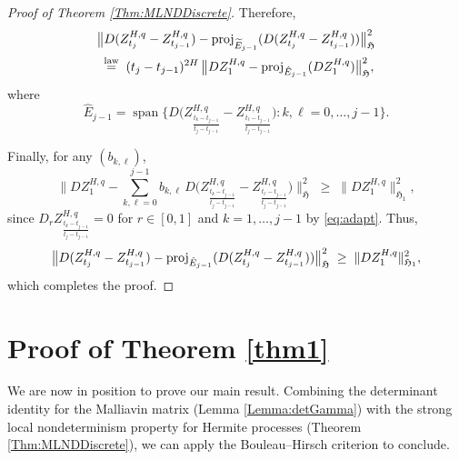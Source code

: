 \documentclass[a4paper,10pt]{article}
\theoremstyle{definition}
\theoremstyle{plain}
\newcommand\HHH{\mathfrak{H}}
\newcommand\1{\mathbbm{1}}
\begin{document}
\begin{proof}[Proof of Theorem \ref{Thm:MLNDDiscrete}]
Therefore,
\begin{align*}
&\big\| D(Z^{H,q}_{t_j}-Z^{H,q}_{t_{j-1}}) - {\rm proj}_{\widetilde{E}_{j-1}}(D(Z^{H,q}_{t_j}-Z^{H,q}_{t_{j-1}})) \big\|_{\HHH}^2\\
&\;\overset{\text{law}}{=}\; (t_j-t_{j-1})^{2H}\,
   \big\| DZ^{H,q}_{1} - {\rm proj}_{\hat{E}_{j-1}}(DZ^{H,q}_{1}) \big\|_{\HHH}^2,
\end{align*}
where
\[
\hat{E}_{j-1}=\operatorname{span}\Big\{ D\!\Big(Z^{H,q}_{\frac{t_k-t_{j-1}}{t_j-t_{j-1}}}-Z^{H,q}_{\frac{t_\ell-t_{j-1}}{t_j-t_{j-1}}}\Big): k,\ell=0,\ldots,j-1\Big\}.
\]

Finally, for any $(b_{k,\ell})$,
\[
\Big\| DZ^{H,q}_{1} - \sum_{k,\ell=0}^{j-1} b_{k,\ell}\,D\!\Big(Z^{H,q}_{\frac{t_k-t_{j-1}}{t_j-t_{j-1}}}-Z^{H,q}_{\frac{t_\ell-t_{j-1}}{t_j-t_{j-1}}}\Big)\Big\|_{\HHH}^2
\;\ge\; \|DZ^{H,q}_1\|_{\HHH_1}^2,
\]
since $D_r Z^{H,q}_{\frac{t_k-t_{j-1}}{t_j-t_{j-1}}}=0$ for $r\in[0,1]$ and $k=1,\dots,j-1$ by \eqref{eq:adapt}.  
Thus,
\[
\big\| D(Z^{H,q}_{t_j}-Z^{H,q}_{t_{j-1}}) - {\rm proj}_{\hat{E}_{j-1}}(D(Z^{H,q}_{t_j}-Z^{H,q}_{t_{j-1}})) \big\|_{\HHH}^2
\;\ge\; \|DZ^{H,q}_1\|_{\HHH_1}^2,
\]
which completes the proof.
\end{proof}

\section{Proof of Theorem \ref{thm1}}\label{sec:proof}

We are now in position to prove our main result.  
Combining the determinant identity for the Malliavin matrix (Lemma \ref{Lemma:detGamma}) with the strong local nondeterminism property for Hermite processes (Theorem \ref{Thm:MLNDDiscrete}), we can apply the Bouleau--Hirsch criterion to conclude.  
\end{document}

